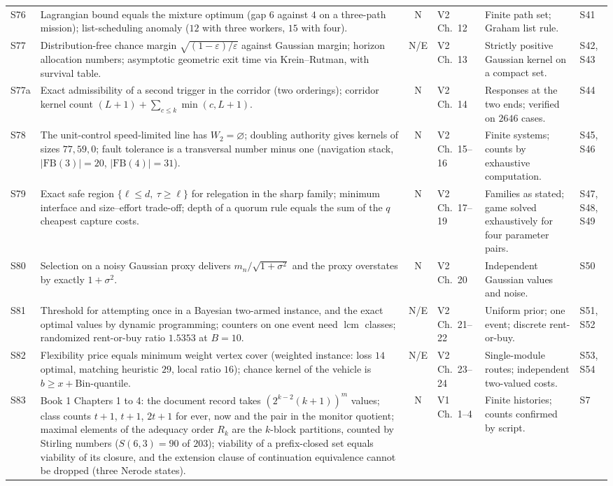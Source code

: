 \documentclass[10pt]{article}
\begin{document}
\begin{longtable}{@{}l p{} c l p{} p{}@{}}
S76 & Lagrangian bound equals the mixture optimum (gap $6$ against $4$ on a three-path mission); list-scheduling anomaly ($12$ with three workers, $15$ with four). & N & V2 Ch.~12 & Finite path set; Graham list rule. & S41\\[3pt]
S77 & Distribution-free chance margin $\sqrt{(1-\varepsilon)/\varepsilon}$ against Gaussian margin; horizon allocation numbers; asymptotic geometric exit time via Krein--Rutman, with survival table. & N/E & V2 Ch.~13 & Strictly positive Gaussian kernel on a compact set. & S42, S43\\[3pt]
S77a & Exact admissibility of a second trigger in the corridor (two orderings); corridor kernel count $(L+1)+\sum_{c\le k}\min(c,L+1)$. & N & V2 Ch.~14 & Responses at the two ends; verified on $2646$ cases. & S44\\[3pt]
S78 & The unit-control speed-limited line has $W_2=\varnothing$; doubling authority gives kernels of sizes $77,59,0$; fault tolerance is a transversal number minus one (navigation stack, $|\mathrm{FB}(3)|=20$, $|\mathrm{FB}(4)|=31$). & N & V2 Ch.~15--16 & Finite systems; counts by exhaustive computation. & S45, S46\\[3pt]
S79 & Exact safe region $\{\ell\le d,\ \tau\ge\ell\}$ for relegation in the sharp family; minimum interface and size--effort trade-off; depth of a quorum rule equals the sum of the $q$ cheapest capture costs. & N & V2 Ch.~17--19 & Families as stated; game solved exhaustively for four parameter pairs. & S47, S48, S49\\[3pt]
S80 & Selection on a noisy Gaussian proxy delivers $m_n/\sqrt{1+\sigma^2}$ and the proxy overstates by exactly $1+\sigma^2$. & N & V2 Ch.~20 & Independent Gaussian values and noise. & S50\\[3pt]
S81 & Threshold for attempting once in a Bayesian two-armed instance, and the exact optimal values by dynamic programming; counters on one event need $\operatorname{lcm}$ classes; randomized rent-or-buy ratio $1.5353$ at $B=10$. & N/E & V2 Ch.~21--22 & Uniform prior; one event; discrete rent-or-buy. & S51, S52\\[3pt]
S82 & Flexibility price equals minimum weight vertex cover (weighted instance: loss $14$ optimal, matching heuristic $29$, local ratio $16$); chance kernel of the vehicle is $b\ge x+\mathrm{Bin}$-quantile. & N/E & V2 Ch.~23--24 & Single-module routes; independent two-valued costs. & S53, S54\\[3pt]
S83 & Book 1 Chapters 1 to 4: the document record takes $(2^{k-2}(k+1))^m$ values; class counts $t+1$, $t+1$, $2t+1$ for ever, now and the pair in the monitor quotient; maximal elements of the adequacy order $R_k$ are the $k$-block partitions, counted by Stirling numbers ($S(6,3)=90$ of $203$); viability of a prefix-closed set equals viability of its closure, and the extension clause of continuation equivalence cannot be dropped (three Nerode states). & N & V1 Ch.~1--4 & Finite histories; counts confirmed by script. & S7\\[3pt]

\end{longtable}
\end{document}
